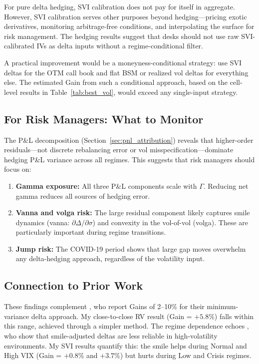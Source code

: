 \documentclass[12pt, letterpaper]{article}
\begin{document}
For pure delta hedging, SVI calibration does not pay for itself in aggregate. However, SVI calibration serves other purposes beyond hedging---pricing exotic derivatives, monitoring arbitrage-free conditions, and interpolating the surface for risk management. The hedging results suggest that desks should not use raw SVI-calibrated IVs as delta inputs without a regime-conditional filter.

A practical improvement would be a moneyness-conditional strategy: use SVI deltas for the OTM call book and flat BSM or realized vol deltas for everything else. The estimated Gain from such a conditional approach, based on the cell-level results in Table~\ref{tab:best_vol}, would exceed any single-input strategy.

\subsection{For Risk Managers: What to Monitor}

The P\&L decomposition (Section~\ref{sec:pnl_attribution}) reveals that higher-order residuals---not discrete rebalancing error or vol misspecification---dominate hedging P\&L variance across all regimes. This suggests that risk managers should focus on:
\begin{enumerate}
    \item \textbf{Gamma exposure:} All three P\&L components scale with $\Gamma$. Reducing net gamma reduces all sources of hedging error.
    \item \textbf{Vanna and volga risk:} The large residual component likely captures smile dynamics (vanna: $\partial\Delta/\partial\sigma$) and convexity in the vol-of-vol (volga). These are particularly important during regime transitions.
    \item \textbf{Jump risk:} The COVID-19 period shows that large gap moves overwhelm any delta-hedging approach, regardless of the volatility input.
\end{enumerate}

\subsection{Connection to Prior Work}

These findings complement \citet{Hull2017}, who report Gains of 2--10\% for their minimum-variance delta approach. My close-to-close RV result (Gain = $+5.8\%$) falls within this range, achieved through a simpler method. The regime dependence echoes \citet{Alexander2012}, who show that smile-adjusted deltas are less reliable in high-volatility environments. My SVI results quantify this: the smile helps during Normal and High VIX (Gain = $+0.8\%$ and $+3.7\%$) but hurts during Low and Crisis regimes.
\end{document}
